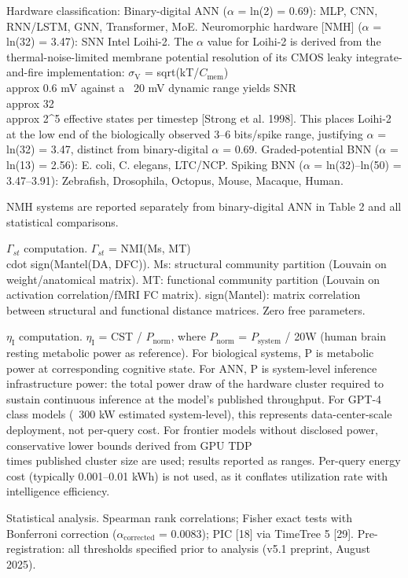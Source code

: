 \documentclass[a4paper,12pt]{article}
\begin{document}
Hardware classification: Binary-digital ANN ($\alpha$ = ln(2) = 0.69): MLP, CNN, RNN/LSTM, GNN, Transformer, MoE. Neuromorphic hardware [NMH\dag] ($\alpha$ = ln(32) = 3.47): SNN Intel Loihi-2. The $\alpha$ value for Loihi-2 is derived from the thermal-noise-limited membrane potential resolution of its CMOS leaky integrate-and-fire implementation: $\sigma_{\text{V}}$ = sqrt(kT/$C_{\text{mem}}$)  \\approx  0.6 mV against a ~20 mV dynamic range yields SNR  \\approx  32  \\approx  2^5 effective states per timestep [Strong et al. 1998]. This places Loihi-2 at the low end of the biologically observed 3--6 bits/spike range, justifying $\alpha$ = ln(32) = 3.47, distinct from binary-digital $\alpha$ = 0.69. Graded-potential BNN ($\alpha$ = ln(13) = 2.56): E. coli, C. elegans, LTC/NCP. Spiking BNN ($\alpha$ = ln(32)--ln(50) = 3.47--3.91): Zebrafish, Drosophila, Octopus, Mouse, Macaque, Human.


\dag{}NMH systems are reported separately from binary-digital ANN in Table 2 and all statistical comparisons.


$\Gamma_{st}$ computation. $\Gamma_{st}$ = NMI(Ms, MT)  \\cdot  sign(Mantel(DA, DFC)). Ms: structural community partition (Louvain on weight/anatomical matrix). MT: functional community partition (Louvain on activation correlation/fMRI FC matrix). sign(Mantel): matrix correlation between structural and functional distance matrices. Zero free parameters.


$\eta_{\text{I}}$ computation. $\eta_{\text{I}}$ = CST / $P_{\text{norm}}$, where $P_{\text{norm}}$ = $P_{\text{system}}$ / 20W (human brain resting metabolic power as reference). For biological systems, P is metabolic power at corresponding cognitive state. For ANN, P is system-level inference infrastructure power: the total power draw of the hardware cluster required to sustain continuous inference at the model's published throughput. For GPT-4 class models (~300 kW estimated system-level), this represents data-center-scale deployment, not per-query cost. For frontier models without disclosed power, conservative lower bounds derived from GPU TDP  \\times  published cluster size are used; results reported as ranges. Per-query energy cost (typically 0.001--0.01 kWh) is not used, as it conflates utilization rate with intelligence efficiency.


Statistical analysis. Spearman rank correlations; Fisher exact tests with Bonferroni correction ($\alpha_{\text{corrected}}$ = 0.0083); PIC [18] via TimeTree 5 [29]. Pre-registration: all thresholds specified prior to analysis (v5.1 preprint, August 2025).
\end{document}
